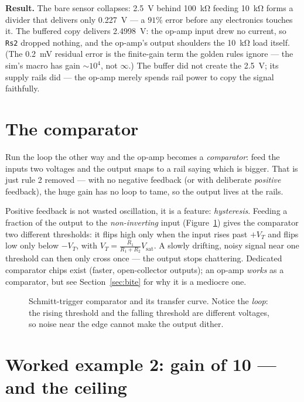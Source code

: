 \textbf{Result.} The bare sensor collapses: \qty{2.5}{\volt} behind
\qty{100}{\kilo\ohm} feeding \qty{10}{\kilo\ohm} forms a divider that
delivers only \qty{0.227}{\volt} — a $91\%$ error before any electronics
touches it. The buffered copy delivers \qty{2.4998}{\volt}: the op-amp
input drew no current, so \texttt{Rs2} dropped nothing, and the op-amp's
output shoulders the \qty{10}{\kilo\ohm} load itself. (The
\qty{0.2}{\milli\volt} residual error is the finite-gain term the golden
rules ignore — the sim's macro has gain $\sim$$10^{4}$, not $\infty$.)
The buffer did not create the \qty{2.5}{\volt}; its supply rails did —
the op-amp merely spends rail power to copy the signal faithfully.

\section{The comparator}
\label{sec:comparator}

Run the loop the other way and the op-amp becomes a
\emph{comparator}: feed the inputs two voltages and the
output snaps to a rail saying which is bigger. That is just rule 2
removed — with no negative feedback (or with deliberate
\emph{positive} feedback), the huge gain has no loop to tame, so the
output lives at the rails.

Positive feedback is not wasted oscillation, it is a feature:
\emph{hysteresis}. Feeding a fraction of the output to
the \emph{non-inverting} input (Figure~\ref{fig:hyst}) gives the
comparator two different thresholds: it flips high only when the input
rises past $+V_T$ and flips low only below $-V_T$, with
$V_T = \frac{R_1}{R_1+R_2}V_{\mathrm{sat}}$. A slowly drifting, noisy
signal near one threshold can then only cross once — the output stops
chattering. Dedicated comparator chips exist (faster, open-collector
outputs); an op-amp \emph{works} as a comparator, but see
Section~\ref{sec:bite} for why it is a mediocre one.

\begin{figure}[htbp]
\centering

\caption{Schmitt-trigger comparator and its transfer curve. Notice the
\emph{loop}: the rising threshold and the falling threshold are different
voltages, so noise near the edge cannot make the output dither.}
\label{fig:hyst}
\end{figure}

\section{Worked example 2: gain of 10 — and the ceiling}
\label{sec:we-clip}

